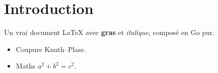 \documentclass{article}
\begin{document}
\hsize=380pt
\section{Introduction}
Un vrai document \LaTeX{} avec \textbf{gras} et \emph{italique}, compos\'e en Go pur.
\begin{itemize}
\item Coupure Knuth--Plass.
\item Maths $a^2+b^2=c^2$.
\end{itemize}
\end{document}
